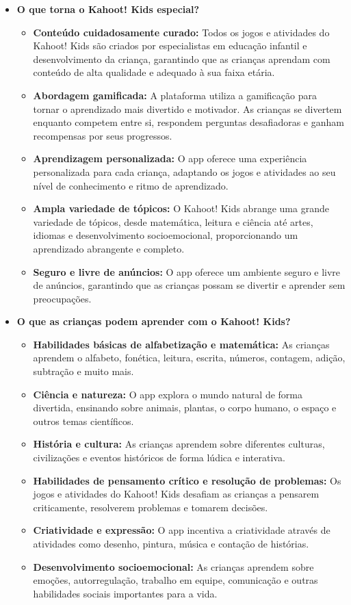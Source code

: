 \begin{itemize}
 \item \textbf{O que torna o Kahoot! Kids especial?}

\begin{itemize}
    \item \textbf{Conteúdo cuidadosamente curado:} Todos os jogos e atividades do Kahoot! Kids são criados por especialistas em educação infantil e desenvolvimento da criança, garantindo que as crianças aprendam com conteúdo de alta qualidade e adequado à sua faixa etária.
    \item \textbf{Abordagem gamificada:} A plataforma utiliza a gamificação para tornar o aprendizado mais divertido e motivador. As crianças se divertem enquanto competem entre si, respondem perguntas desafiadoras e ganham recompensas por seus progressos.
    \item \textbf{Aprendizagem personalizada:} O app oferece uma experiência personalizada para cada criança, adaptando os jogos e atividades ao seu nível de conhecimento e ritmo de aprendizado.
    \item \textbf{Ampla variedade de tópicos:} O Kahoot! Kids abrange uma grande variedade de tópicos, desde matemática, leitura e ciência até artes, idiomas e desenvolvimento socioemocional, proporcionando um aprendizado abrangente e completo.
    \item \textbf{Seguro e livre de anúncios:} O app oferece um ambiente seguro e livre de anúncios, garantindo que as crianças possam se divertir e aprender sem preocupações.
\end{itemize}

\item \textbf{O que as crianças podem aprender com o Kahoot! Kids?}

\begin{itemize}
    \item \textbf{Habilidades básicas de alfabetização e matemática:} As crianças aprendem o alfabeto, fonética, leitura, escrita, números, contagem, adição, subtração e muito mais.
    \item \textbf{Ciência e natureza:} O app explora o mundo natural de forma divertida, ensinando sobre animais, plantas, o corpo humano, o espaço e outros temas científicos.
    \item \textbf{História e cultura:} As crianças aprendem sobre diferentes culturas, civilizações e eventos históricos de forma lúdica e interativa.
    \item \textbf{Habilidades de pensamento crítico e resolução de problemas:} Os jogos e atividades do Kahoot! Kids desafiam as crianças a pensarem criticamente, resolverem problemas e tomarem decisões.
    \item \textbf{Criatividade e expressão:} O app incentiva a criatividade através de atividades como desenho, pintura, música e contação de histórias.
    \item \textbf{Desenvolvimento socioemocional:} As crianças aprendem sobre emoções, autorregulação, trabalho em equipe, comunicação e outras habilidades sociais importantes para a vida.
\end{itemize}


\end{itemize}
